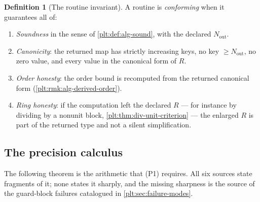 \documentclass[11pt,oneside]{article}
\theoremstyle{plain}
\theoremstyle{definition}
\newtheorem{definition}[theorem]{Definition}
\theoremstyle{remark}
\begin{document}
\begin{definition}[The routine invariant]\label{plt:def:alg-invariant}
A routine is \emph{conforming} when it guarantees all of:
\begin{enumerate}
\item[(P1)] \emph{Soundness} in the sense of \cref{plt:def:alg-sound}, with the
      declared \(N_{\mathrm{out}}\).
\item[(P2)] \emph{Canonicity}: the returned map has strictly increasing keys, no
      key \(\ge N_{\mathrm{out}}\), no zero value, and every value in the
      canonical form of \(R\).
\item[(P3)] \emph{Order honesty}: the order bound is recomputed from the
      returned canonical form (\cref{plt:rmk:alg-derived-order}).
\item[(P4)] \emph{Ring honesty}: if the computation left the declared \(R\) --- for
      instance by dividing by a nonunit block, \cref{plt:thm:div-unit-criterion}
      --- the enlarged \(R\) is part of the returned type and not a silent
      simplification.
\end{enumerate}
\end{definition}

\subsection{The precision calculus}
\label{plt:sec:alg-precision}

The following theorem is the arithmetic that (P1) requires.  All six sources
state fragments of it; none states it sharply, and the missing sharpness is the
source of the guard-block failures catalogued in
\cref{plt:sec:failure-modes}.
\end{document}
